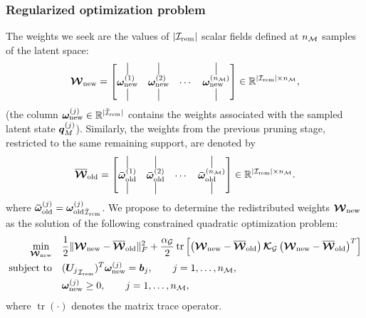 \documentclass[11pt,a4paper]{article}
\begin{document}
\subsubsection{Regularized optimization problem}
\label{sec:regoptprobl}

%

 The  weights we seek are the values of $|\Irem|$ scalar fields defined at $\nM$ samples of the latent space:
\begin{equation}
\Wnew
=
\begin{bmatrix}
\label{eq:wnew}
\big| & \big| &        & \big| \\
\wnew{1} & \wnew{2} & \cdots & \wnew{\nM} \\
\big| & \big| &        & \big|
\end{bmatrix}
\in
\mathbb{R}^{|\Irem|\times\nM},
\end{equation}
(the column
\(\wnew{j}\in\mathbb{R}^{|\IremLOC|}\) contains the   weights
associated with the sampled latent state \(\qMj{j}\)). Similarly, the weights from the previous pruning stage, restricted to
the same remaining support, are denoted by
\[
\Woldrem
=
\begin{bmatrix}
\big| & \big| &        & \big| \\
\woldrem{1} & \woldrem{2} & \cdots & \woldrem{\nM} \\
\big| & \big| &        & \big|
\end{bmatrix}
\in
\mathbb{R}^{|\Irem|\times\nM}.
\]
where $\woldrem{j} = \woldremDEF{j}$.  We propose to determine the redistributed weights $\Wnew$ as the solution of the
following constrained quadratic optimization problem:
\begin{equation}
 \label{eq:quadraticGENERAL}
\begin{aligned}
\min_{\Wnew}\quad
&
\frac12
\|
\Wnew-\Woldrem
\|_F^2
+
\frac{\alphaG}{2}
\operatorname{tr}
\left[
\left(\Wnew-\Woldrem\right)
\KGs
\left(\Wnew-\Woldrem\right)^T
\right]
\\
\text{subject to}\quad
&
\UremDEFt{j}\wnew{j}
=
\bj{j},
\qquad
j=1,\ldots,\nM,
\\
&
\wnew{j}\ge0,
\qquad
j=1,\ldots,\nM,
\end{aligned}
\end{equation}
where \(\operatorname{tr}(\cdot)\) denotes the matrix trace operator. %
\end{document}
